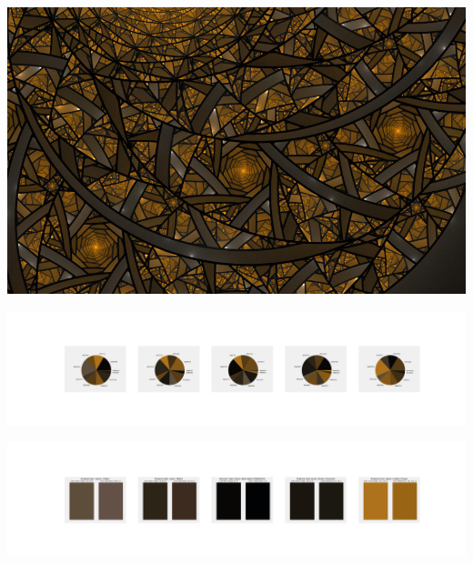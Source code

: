 \documentclass[11pt]{article}
\begin{document}
\begin{landscape}
    \begin{center}
    \includegraphics[width=\textwidth]{./nbimg/file (30).jpg}
    \end{center}

    \begin{center}
    \includegraphics[width=250mm]{./nbimg/pie-223.jpg}
    \end{center}

    \begin{center}
    \includegraphics[width=250mm]{./nbimg/peak-223.jpg}
    \end{center}
    


\end{landscape}
\end{document}
